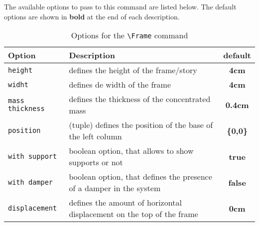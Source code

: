 \documentclass[11pt,letterpaper,oneside]{book}
\begin{document}
The available options to pass to this command are listed below. The default options are shown in \textbf{bold} at the end of each description.\par
\begin{table}[!h]
  \centering
  \caption{Options for the \texttt{\textbackslash Frame} command}
  \begin{tabular}{l p{9cm} |c}\toprule
    Option & Description & default \\\midrule
    \texttt{height} & defines the height of the frame/story & \textbf{4cm}                                      \\
    \texttt{widht}  & defines de width of the frame & \textbf{4cm}                                              \\
    \texttt{mass thickness} & defines the thickness of the concentrated mass & \textbf{0.4cm}                   \\
    \texttt{position} & (tuple) defines the position of the base of the left column & \textbf{\{0,0\}}          \\
    \texttt{with support} & boolean option, that allows to show supports or not & \textbf{true}                 \\
    \texttt{with damper} & boolean option, that defines the presence of a damper in the system & \textbf{false} \\
    \texttt{displacement} & defines the amount of horizontal displacement on the top of the frame & \textbf{0cm}\\\bottomrule
  \end{tabular}
  \label{tab:frameOptions}
\end{table}

\begin{figure}[!ht]
  \centering
  \subfloat[  ]{%
    \begin{tikzpicture}[scale=0.6]
      \Frame[position = {0cm,0em}, height = 6cm]
      \Frame[position = {0cm,6cm},height = 4cm, with support = false]
      \Frame[position = {0cm,10cm},height = 4cm, with support = false]
    \end{tikzpicture}
  }
  \qquad
  \subfloat[  ]{%
    \begin{tikzpicture}[scale=0.6]
      \Frame[position = {0em,0em}, displacement = 0.15cm]
      \Frame[position = {0.15cm,4cm}, with support = false, displacement = 1.35cm]
      \Frame[position = {1.5cm,8cm}, with support = false, displacement = 3.4cm]
    \end{tikzpicture}
  }

  \label{fig:rigi1}
\end{figure}
\end{document}
